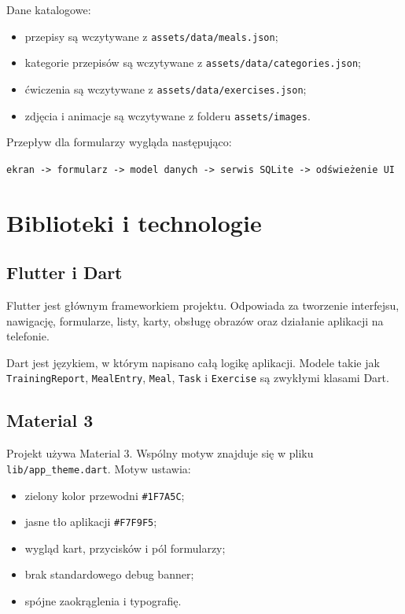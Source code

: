 \documentclass[12pt,a4paper]{article}
\begin{document}
Dane katalogowe:

\begin{itemize}
    \item przepisy są wczytywane z \texttt{assets/data/meals.json};
    \item kategorie przepisów są wczytywane z \texttt{assets/data/categories.json};
    \item ćwiczenia są wczytywane z \texttt{assets/data/exercises.json};
    \item zdjęcia i animacje są wczytywane z folderu \texttt{assets/images}.
\end{itemize}

Przepływ dla formularzy wygląda następująco:

\begin{center}
\texttt{ekran -> formularz -> model danych -> serwis SQLite -> odświeżenie UI}
\end{center}

\section{Biblioteki i technologie}

\subsection{Flutter i Dart}

Flutter jest głównym frameworkiem projektu. Odpowiada za tworzenie interfejsu, nawigację, formularze, listy, karty, obsługę obrazów oraz działanie aplikacji na telefonie.

Dart jest językiem, w którym napisano całą logikę aplikacji. Modele takie jak \texttt{TrainingReport}, \texttt{MealEntry}, \texttt{Meal}, \texttt{Task} i \texttt{Exercise} są zwykłymi klasami Dart.

\subsection{Material 3}

Projekt używa Material 3. Wspólny motyw znajduje się w pliku \texttt{lib/app\_theme.dart}. Motyw ustawia:

\begin{itemize}
    \item zielony kolor przewodni \texttt{\#1F7A5C};
    \item jasne tło aplikacji \texttt{\#F7F9F5};
    \item wygląd kart, przycisków i pól formularzy;
    \item brak standardowego debug banner;
    \item spójne zaokrąglenia i typografię.
\end{itemize}
\end{document}

